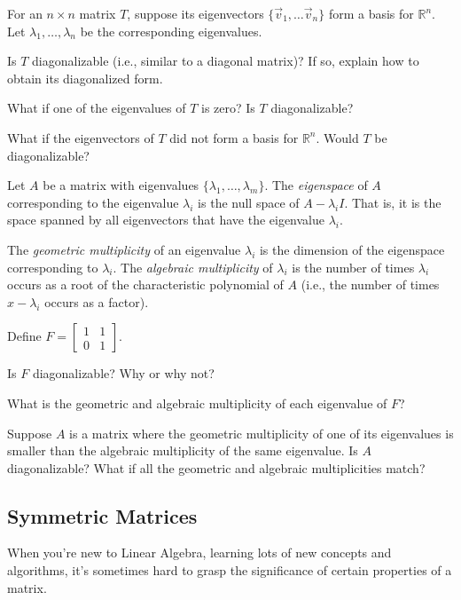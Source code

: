 \documentclass[14pt]{problemset}
\newcommand{\R}{\mathbb{R}}
\newcommand{\mat}[1]{\begin{bmatrix}#1\end{bmatrix}}
\begin{document}
	\question
	For an $n\times n$ matrix $T$, suppose its eigenvectors $\{\vec v_1,\ldots \vec v_n\}$
	form a basis for $\R^n$.  Let $\lambda_1,\ldots,\lambda_n$ be the corresponding
	eigenvalues.
	

	\begin{parts}
	\item Is $T$ diagonalizable (i.e., similar to a diagonal matrix)?  If so, explain how to obtain its diagonalized form.
		\item What if one of the eigenvalues of $T$ is zero?  Is $T$ diagonalizable?
		\item What if the eigenvectors of $T$ did not form a basis for $\R^n$.
			Would $T$ be diagonalizable?
	\end{parts}

	\begin{definition}[Eigenspace]
	Let $A$ be a matrix with eigenvalues $\{\lambda_1,\ldots,\lambda_m\}$.  The
	\emph{eigenspace} of $A$ corresponding to the eigenvalue $\lambda_i$ is the
	null space of $A-\lambda_i I$.  That is, it is the space spanned by all eigenvectors
	that have the eigenvalue $\lambda_i$.

	The \emph{geometric multiplicity} of an eigenvalue $\lambda_i$ is the dimension
	of the eigenspace corresponding to $\lambda_i$.  The \emph{algebraic multiplicity}
	of $\lambda_i$ is the number of times $\lambda_i$ occurs as a root of the
	characteristic polynomial of $A$ (i.e., the number of times $x-\lambda_i$
	occurs as a factor).
	\end{definition}

	\question
	Define $F=\mat{1&1\\0&1}$.
	\begin{parts}
		\item Is $F$ diagonalizable?  Why or why not?
		\item What is the geometric and algebraic multiplicity of each eigenvalue
			of $F$?
		\item Suppose $A$ is a matrix where the geometric multiplicity of one of its eigenvalues
			is smaller than the algebraic multiplicity of the same eigenvalue.  Is
			$A$ diagonalizable?  What if all the geometric and algebraic multiplicities
			match?
	\end{parts}


\subsection*{Symmetric Matrices}
	When you're new to Linear Algebra, learning lots of new concepts and algorithms,
	it's sometimes hard to grasp the significance of certain properties of a matrix.
\end{document}
